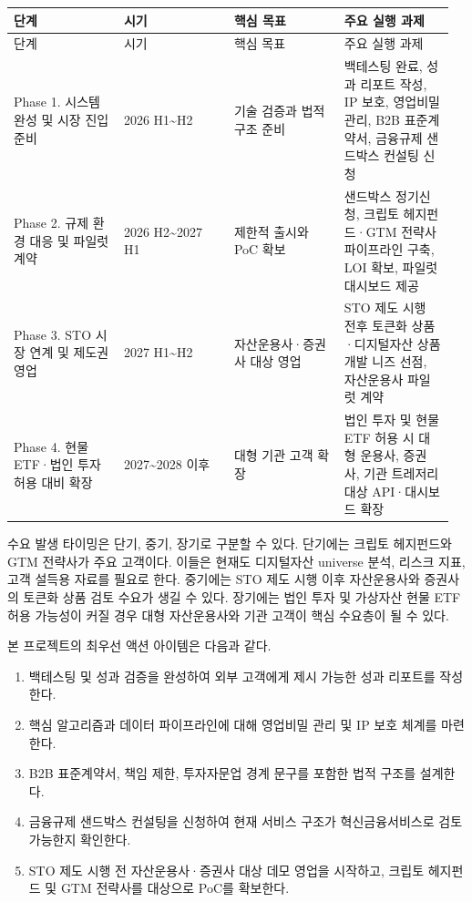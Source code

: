 \documentclass[12pt,a4paper]{article}
\begin{document}
\begin{center}
\small
\begin{longtable}{@{}p{0.24\linewidth}p{0.24\linewidth}p{0.24\linewidth}p{0.24\linewidth}@{}}
\toprule
단계 & 시기 & 핵심 목표 & 주요 실행 과제 \\
\midrule
\endfirsthead
\toprule
단계 & 시기 & 핵심 목표 & 주요 실행 과제 \\
\midrule
\endhead
Phase 1. 시스템 완성 및 시장 진입 준비 & 2026 H1\textasciitilde{}H2 & 기술 검증과 법적 구조 준비 & 백테스팅 완료, 성과 리포트 작성, IP 보호, 영업비밀 관리, B2B 표준계약서, 금융규제 샌드박스 컨설팅 신청 \\
Phase 2. 규제 환경 대응 및 파일럿 계약 & 2026 H2\textasciitilde{}2027 H1 & 제한적 출시와 PoC 확보 & 샌드박스 정기신청, 크립토 헤지펀드·GTM 전략사 파이프라인 구축, LOI 확보, 파일럿 대시보드 제공 \\
Phase 3. STO 시장 연계 및 제도권 영업 & 2027 H1\textasciitilde{}H2 & 자산운용사·증권사 대상 영업 & STO 제도 시행 전후 토큰화 상품·디지털자산 상품 개발 니즈 선점, 자산운용사 파일럿 계약 \\
Phase 4. 현물 ETF·법인 투자 허용 대비 확장 & 2027\textasciitilde{}2028 이후 & 대형 기관 고객 확장 & 법인 투자 및 현물 ETF 허용 시 대형 운용사, 증권사, 기관 트레저리 대상 API·대시보드 확장 \\
\bottomrule
\end{longtable}
\end{center}

수요 발생 타이밍은 단기, 중기, 장기로 구분할 수 있다. 단기에는 크립토 헤지펀드와 GTM 전략사가 주요 고객이다. 이들은 현재도 디지털자산 universe 분석, 리스크 지표, 고객 설득용 자료를 필요로 한다. 중기에는 STO 제도 시행 이후 자산운용사와 증권사의 토큰화 상품 검토 수요가 생길 수 있다. 장기에는 법인 투자 및 가상자산 현물 ETF 허용 가능성이 커질 경우 대형 자산운용사와 기관 고객이 핵심 수요층이 될 수 있다.

본 프로젝트의 최우선 액션 아이템은 다음과 같다.

\begin{enumerate}
\item 백테스팅 및 성과 검증을 완성하여 외부 고객에게 제시 가능한 성과 리포트를 작성한다.
\item 핵심 알고리즘과 데이터 파이프라인에 대해 영업비밀 관리 및 IP 보호 체계를 마련한다.
\item B2B 표준계약서, 책임 제한, 투자자문업 경계 문구를 포함한 법적 구조를 설계한다.
\item 금융규제 샌드박스 컨설팅을 신청하여 현재 서비스 구조가 혁신금융서비스로 검토 가능한지 확인한다.
\item STO 제도 시행 전 자산운용사·증권사 대상 데모 영업을 시작하고, 크립토 헤지펀드 및 GTM 전략사를 대상으로 PoC를 확보한다.
\end{enumerate}
\end{document}
